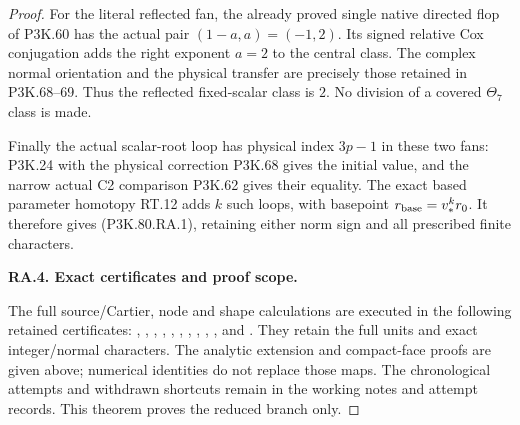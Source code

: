 \begin{proof}
For the literal reflected fan, the already proved single
native directed flop of P3K.60 has the actual pair
\((1-a,a)=(-1,2)\). Its signed relative Cox conjugation
adds the right exponent \(a=2\) to the central class.
The complex normal orientation and the physical transfer
are precisely those retained in P3K.68--69. Thus the
reflected fixed-scalar class is \(2\). No division of a
covered \(\Theta_7\) class is made.

Finally the actual scalar-root loop has physical index
\(3p-1\) in these two fans: P3K.24 with the physical
correction P3K.68 gives the initial value, and the narrow
actual C2 comparison P3K.62 gives their equality.
The exact based parameter homotopy RT.12 adds \(k\) such
loops, with basepoint \(r_{\rm base}=v_*^k r_0\).
It therefore gives (P3K.80.RA.1), retaining either norm sign
and all prescribed finite characters.

\par\medskip\noindent\textbf{RA.4. Exact certificates and proof scope.}\par\nopagebreak[4]

The full source/Cartier, node and shape calculations are
executed in the following retained certificates:
,
,
,
,
,
,
,
,
,
,
and .
They retain the full units and exact integer/normal
characters. The analytic extension and compact-face proofs
are given above; numerical identities do not replace those
maps. The chronological attempts and withdrawn shortcuts
remain in the working notes and attempt records. This
theorem proves the reduced branch only.
\end{proof}
